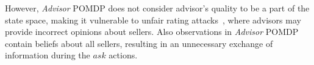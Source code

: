 \documentclass{aamas2014}
\providecommand{\SALEP}{SALE POMDP}
\begin{document}
However, \textit{Advisor} POMDP does not consider advisor's quality to be a part of the state space, making it vulnerable to unfair rating attacks~\cite{irissappane2012towards}, where advisors may provide incorrect opinions about sellers. Also observations in \textit{Advisor} POMDP contain beliefs about all sellers, resulting in an unnecessary exchange of information during the $ask$ actions.

%
%
%
\end{document}
